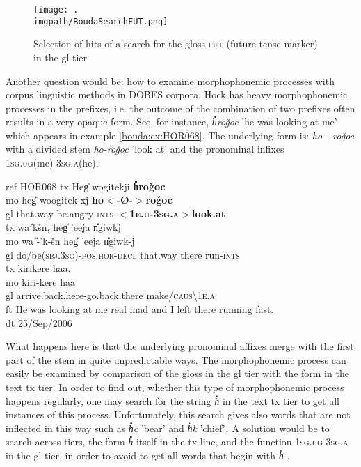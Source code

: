 \begin{figure}
\texttt{[image: .\\imgpath/BoudaSearchFUT.png]}
\caption{Selection of hits of a search for the gloss \textsc{fut} (future tense marker) in the gl tier}
\label{bouda:fig:futuresearch}
\end{figure}


Another question would be: how to examine morphophonemic processes with corpus linguistic methods in DOBES corpora. Hoc{\A}k has heavy morphophonemic processes in the prefixes, i.e. the outcome of the combination of two prefixes often results in a very opaque form. See, for instance, \textit{h{\U}{\U}ro\v{g}oc} 'he was looking at me' which appears in example \ref{bouda:ex:HOR068}. The underlying form is: \textit{ho-{\II}-{\OO}-ro\v{g}oc} with a divided stem \textit{ho-ro\v{g}oc} 'look at' and the pronominal infixes 1\textsc{sg.ug}(me)-\textsc{3sg.a}(he). 
 
\ea\label{bouda:ex:HOR068}
ref HOR068
\glll 
tx Heg{\U} wogitekji        \textbf{h{\U}{\U}ro\v{g}oc}         \\
mo heg{\U} woogitek-xj{\II} \textbf{ho$<${\II}-\O-$>$ro\v{g}oc}   \\
gl that.way be.angry-\textsc{ints}   \textbf{$<$1\textsc{e.u}-\textsc{3sg.a}$>$look.at}        \\
\glll
tx wa'{\U}{\A}k\v{s}{\A}n{\A}, heg{\U} 'eeja n{\U}{\U}giw{\A}kj{\II}  \\  
mo wa'{\U}-'{\A}k-\v{s}{\A}n{\A} heg{\U} 'eeja n{\U}{\U}giw{\A}k-j{\II} \\
gl do/be(\textsc{sbj.3sg})-\textsc{pos.hor}-\textsc{decl} that.way there run-\textsc{ints}                    \\
\glll
tx kirikere haa. \\
mo kiri-kere haa \\
gl arrive.back.here-go.back.there make/\textsc{caus}{\textbackslash}1\textsc{e.a}\\

ft He was looking at me real mad and I left there running fast.\\
dt 25/Sep/2006\\
\z

What happens here is that the underlying pronominal affixes merge with the first part of the stem in quite unpredictable ways. The morphophonemic process can easily be examined by comparison of the gloss in the gl tier with the form in the text tx tier. In order to find out, whether this type of morphophonemic process happens regularly, one may search for the string \textit{h{\U}{\U}} in the text tx tier to get all instances of this process. Unfortunately, this search gives also words that are not inflected in this way such as \textit{h{\U}{\U}c} 'bear' and \textit{h{\U}{\U}k} 'chief'\textbf{\textit{.}} A solution would be to search across tiers, the form \textit{h{\U}{\U}} itself in the tx line, and the function 1\textsc{sg.ug}-\textsc{3sg.a} in the gl tier, in order to avoid to get all words that begin with \textit{h{\U}{\U}-}. 

